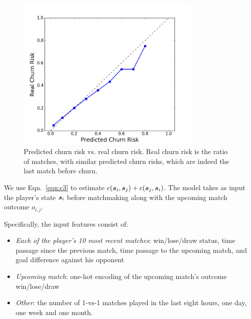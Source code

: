 \begin{figure}[t]
\centering
\includegraphics[width=0.8\textwidth]{Figures/prob_calib_lr_line.png}
\caption{Predicted churn risk vs. real churn risk. Real churn risk is the ratio of matches, with similar predicted churn risks, which are indeed the last match before churn. }
\label{fig:lr_cali}
\end{figure}

We use Eqn.~\ref{eqn:c3} to estimate $c(\boldsymbol{s}_i, \boldsymbol{s}_j) + c(\boldsymbol{s}_j, \boldsymbol{s}_i)$. The model takes as input the player's state $\boldsymbol{s}_i$ before matchmaking along with the upcoming match outcome $o_{i, j}$.

Specifically, the input features consist of:
\begin{itemize}
\item \textit{Each of the player's 10 most recent matches}: win/lose/draw status, time passage since the previous match, time passage to the upcoming match, and goal difference against his opponent
\item \textit{Upcoming match}: one-hot encoding of the upcoming match's outcome win/lose/draw
\item \textit{Other}: the number of 1-vs-1 matches played in the last eight hours, one day, one week and one month.
\end{itemize}


